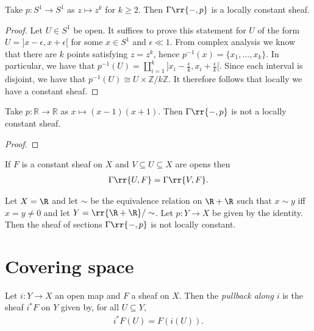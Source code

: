 \documentclass{article}
\begin{document}
\begin{example}
  Take $p:S^1 \to S^1$ as $z\mapsto z^k$ for $k\geq 2$.
  Then $\Gamma\rr{-,p}$ is a locally constant sheaf.
  \begin{proof}
    Let $U \in S^1$ be open. It suffices to prove this statement for $U$ of the form $U = ]x - \epsilon, x + \epsilon[$ for some $x \in S^1$ and $\epsilon \ll 1$. From complex analysis we know that there are $k$ points satisfying $z = z^k$, hence $p^{-1}(x) = \{x_1, ..., x_k\}$. In particular, we have that $p^{-1}(U) = \amalg_{i=1}^k ]x_i - \frac{\epsilon}{k}, x_i + \frac{\epsilon}{k}[$. Since each interval is disjoint, we have that $p^{-1}(U) \cong U \times \mathbb{Z}/k\mathbb{Z}$. It therefore follows that locally we have a constant sheaf.
    \missingproof
  \end{proof}
\end{example}

\begin{nonexample}
  Take $p: \mathbb{R} \to \mathbb{R}$ as $x \mapsto (x-1)(x+1)$.
  Then $\Gamma\rr{-,p}$ is not a locally constant sheaf.
  \begin{proof}
    \missingproof
  \end{proof}
\end{nonexample}

\begin{lemma}
  If $F$ is a constant sheaf on $X$ and $V\subseteq U\subseteq X$ are opens then
  \begin{align*}
    \Gamma\rr{U, F} = \Gamma\rr{V,F}.
  \end{align*}
\end{lemma}

\begin{example}
  Let $X=\R$ and let $\sim$ be the equivalence relation on $\R+\R$ such that
  $x\sim y$ iff $x=y\neq 0$ and let $Y=\rr{\R+\R}/\sim$. Let $p:Y\to X$ be
  given by the identity. Then the sheaf of sections $\Gamma\rr{-,p}$
  is not locally constant.
\end{example}

\section{Covering space}\label{sec:covering_space}

\begin{definition}
  Let $i:Y\to X$ an open map and $F$ a sheaf on $X$. Then
  the \emph{pullback along $i$} is the sheaf $i^*F$ on $Y$
  given by, for all $U\subseteq Y$,
  \begin{align*}
    i^*F(U) = F(i(U)).
  \end{align*}
\end{definition}
\end{document}
